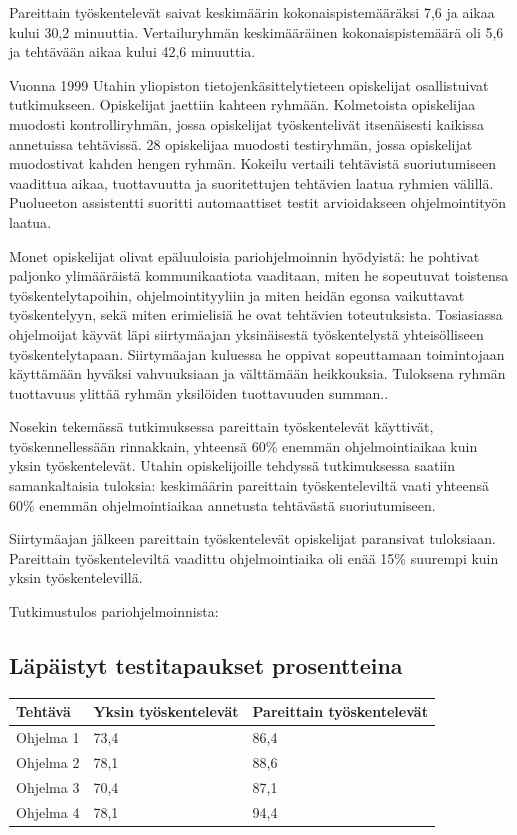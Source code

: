\documentclass[finnish]{tktltiki2}
\theoremstyle{definition}
\theoremstyle{remark}
\begin{document}
Pareittain työskentelevät saivat keskimäärin kokonaispistemääräksi 7,6 ja aikaa kului 30,2 minuuttia. Vertailuryhmän keskimääräinen kokonaispistemäärä oli 5,6 ja tehtävään aikaa kului 42,6 minuuttia\cite{NOS98}.

Vuonna 1999 Utahin yliopiston tietojenkäsittelytieteen opiskelijat osallistuivat tutkimukseen. Opiskelijat jaettiin kahteen ryhmään. Kolmetoista opiskelijaa muodosti kontrolliryhmän, jossa opiskelijat työskentelivät itsenäisesti kaikissa annetuissa tehtävissä. 28 opiskelijaa muodosti testiryhmän, jossa opiskelijat muodostivat kahden hengen ryhmän. Kokeilu vertaili tehtävistä suoriutumiseen vaadittua aikaa, tuottavuutta ja suoritettujen tehtävien laatua ryhmien välillä. Puolueeton assistentti suoritti automaattiset testit arvioidakseen ohjelmointityön laatua\cite{WIL00}.

Monet opiskelijat olivat epäluuloisia pariohjelmoinnin hyödyistä: he pohtivat paljonko ylimääräistä kommunikaatiota vaaditaan, miten he sopeutuvat toistensa työskentelytapoihin, ohjelmointityyliin ja miten heidän egonsa vaikuttavat työskentelyyn, sekä miten erimielisiä he ovat tehtävien toteutuksista. Tosiasiassa ohjelmoijat käyvät läpi siirtymäajan yksinäisestä työskentelystä yhteisölliseen työskentelytapaan. Siirtymäajan kuluessa he oppivat sopeuttamaan toimintojaan käyttämään hyväksi vahvuuksiaan ja välttämään heikkouksia. Tuloksena ryhmän tuottavuus ylittää ryhmän yksilöiden tuottavuuden summan.\cite{WIL00}.

Nosekin tekemässä tutkimuksessa pareittain työskentelevät käyttivät, työskennellessään rinnakkain, yhteensä 60\% enemmän ohjelmointiaikaa kuin yksin työskentelevät\cite{NOS98}. Utahin opiskelijoille tehdyssä tutkimuksessa saatiin samankaltaisia tuloksia: keskimäärin pareittain työskenteleviltä vaati yhteensä 60\% enemmän ohjelmointiaikaa annetusta tehtävästä suoriutumiseen\cite{WIL00}.

Siirtymäajan jälkeen pareittain työskentelevät opiskelijat paransivat tuloksiaan. Pareittain työskenteleviltä vaadittu ohjelmointiaika oli enää 15\% suurempi kuin yksin työskentelevillä\cite{WIL00}.

Tutkimustulos pariohjelmoinnista\cite{WIL00}:

\subsection*{Läpäistyt testitapaukset prosentteina}
\begin{center}
    \begin{tabular}{ | l | l | p{5cm} |}
    \hline
    Tehtävä & Yksin työskentelevät & Pareittain työskentelevät \\ \hline
    Ohjelma 1 & 73,4 & 86,4 \\ \hline
    Ohjelma 2 & 78,1 & 88,6 \\ \hline
    Ohjelma 3 & 70,4 & 87,1 \\ \hline
    Ohjelma 4 & 78,1 & 94,4 \\ \hline
    \end{tabular}
\end{center}
\end{document}
